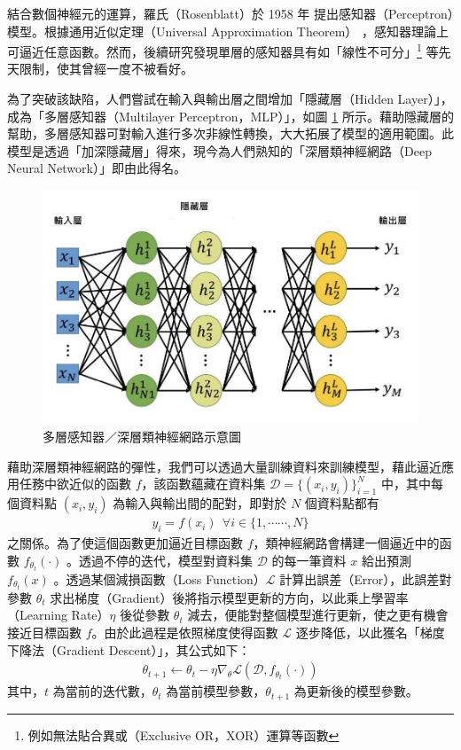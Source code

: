         結合數個神經元的運算，羅氏（Rosenblatt）於 1958 年 \cite{rosenblatt_perceptron_1958} 提出感知器（Perceptron）模型。根據通用近似定理（Universal Approximation Theorem）\cite{funahashi_approximate_1989} ，感知器理論上可逼近任意函數。然而，後續研究發現單層的感知器具有如「線性不可分」\footnote{例如無法貼合異或（Exclusive OR，XOR）運算等函數} 等先天限制，使其曾經一度不被看好。

        為了突破該缺陷，人們嘗試在輸入與輸出層之間增加「隱藏層（Hidden Layer）」，成為「多層感知器（Multilayer Perceptron，MLP）」，如圖 \ref{fig:mlp} 所示。藉助隱藏層的幫助，多層感知器可對輸入進行多次非線性轉換，大大拓展了模型的適用範圍。此模型是透過「加深隱藏層」得來，現今為人們熟知的「深層類神經網路（Deep Neural Network）」即由此得名。

\begin{figure}
    \centering
    \includegraphics[width=0.8\linewidth]{figures/nnout.png}
    \caption{多層感知器／深層類神經網路示意圖}
    \label{fig:mlp}
\end{figure}
        藉助深層類神經網路的彈性，我們可以透過大量訓練資料來訓練模型，藉此逼近應用任務中欲近似的函數 $f$，該函數蘊藏在資料集 $\mathcal{D} = \{(x_i, y_i)\}_{i=1}^N$ 中，其中每個資料點 $(x_i, y_i)$ 為輸入與輸出間的配對，即對於 $N$ 個資料點都有 
\begin{align}
    y_i = f(x_i) \ \  \forall i \in \{1, \cdots\cdots, N\}
\end{align}
之關係。為了使這個函數更加逼近目標函數 $f$，類神經網路會構建一個逼近中的函數 $f_{\theta_t}(\cdot)$ 。透過不停的迭代，模型對資料集 $\mathcal{D}$ 的每一筆資料 $x$ 給出預測 $f_{\theta_t}(x)$ 。透過某個減損函數（Loss Function）$\mathcal{L}$ 計算出誤差（Error），此誤差對參數 $\theta_t$ 求出梯度（Gradient）後將指示模型更新的方向，以此乘上學習率（Learning Rate）$\eta$ 後從參數  $\theta_t$ 減去，便能對整個模型進行更新，使之更有機會接近目標函數 $f$。由於此過程是依照梯度使得函數 $\mathcal{L}$ 逐步降低，以此獲名「梯度下降法（Gradient Descent）」，其公式如下：
\begin{align}
    \theta_{t+1} \leftarrow \theta_{t} - \eta \nabla_\theta\mathcal{L}(\mathcal{D}, f_{\theta_t}(\cdot))
\end{align}
其中，$t$ 為當前的迭代數，$\theta_t$ 為當前模型參數，$\theta_{t+1}$ 為更新後的模型參數。

